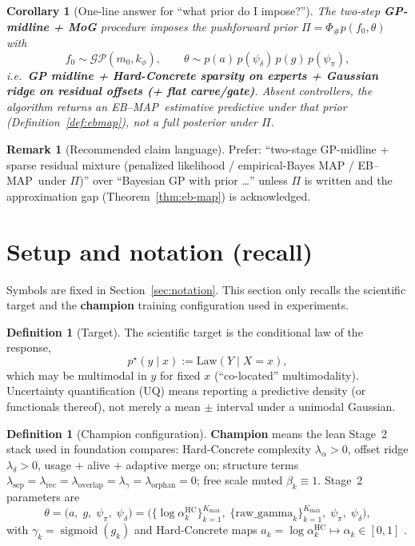 \documentclass[11pt,a4paper]{article}
\theoremstyle{plain}
\newtheorem{corollary}[theorem]{Corollary}
\theoremstyle{definition}
\newtheorem{definition}[theorem]{Definition}
\newtheorem{remark}[theorem]{Remark}
\theoremstyle{remark}
\newcommand{\GP}{\mathcal{GP}}
\newcommand{\tht}{\theta}
\newcommand{\sigmoid}{\operatorname{sigmoid}}
\newcommand{\Kmax}{K_{\max}}
\newcommand{\law}{\mathrm{Law}}
\newcommand{\EBMAP}{EB--MAP}
\begin{document}
\begin{corollary}[One-line answer for ``what prior do I impose?'']
The two-step \textbf{GP-midline + MoG} procedure imposes the pushforward prior
\(\Pi=\Phi_\# p(f_0,\tht)\) with
\begin{equation}
  f_0\sim\GP(m_0,k_\phi),
  \qquad
  \tht\sim p(a)\,p(\psi_\delta)\,p(g)\,p(\psi_\pi),
\end{equation}
i.e.\ \textbf{GP midline + Hard-Concrete sparsity on experts + Gaussian ridge on residual
offsets (+ flat carve/gate)}.
Absent controllers, the algorithm returns an \EBMAP\ estimative predictive under that
prior (Definition~\ref{def:ebmap}), not a full posterior under \(\Pi\).
\end{corollary}

\begin{remark}[Recommended claim language]
Prefer: ``two-stage GP-midline + sparse residual mixture (penalized likelihood /
empirical-Bayes MAP / \EBMAP\ under \(\Pi\))''
over ``Bayesian GP with prior \ldots'' unless \(\Pi\) is written and the approximation
gap (Theorem~\ref{thm:eb-map}) is acknowledged.
\end{remark}

\section{Setup and notation (recall)}
\label{sec:setup}

Symbols are fixed in Section~\ref{sec:notation}. This section only recalls the
scientific target and the \textbf{champion} training configuration used in experiments.

\begin{definition}[Target]
The scientific target is the conditional law of the response,
\[
  p^\star(y\mid x)
  :=
  \law(Y\mid X=x),
\]
which may be multimodal in \(y\) for fixed \(x\) (``co-located'' multimodality).
Uncertainty quantification (UQ) means reporting a predictive density (or functionals
thereof), not merely a mean \(\pm\) interval under a unimodal Gaussian.
\end{definition}

\begin{definition}[Champion configuration]
\label{def:champion}
\textbf{Champion} means the lean Stage~2 stack used in foundation compares:
Hard-Concrete complexity \(\lambda_\alpha>0\), offset ridge \(\lambda_\delta>0\),
usage + alive + adaptive merge on; structure terms
\(\lambda_{\mathrm{sep}}=\lambda_{\mathrm{rec}}=\lambda_{\mathrm{overlap}}=\lambda_\gamma=\lambda_{\mathrm{orphan}}=0\);
free scale muted \(\beta_k\equiv 1\).
Stage~2 parameters are
\[
  \tht
  =
  \bigl(
    a,\;
    g,\;
    \psi_{\pi},\;
    \psi_{\delta}
  \bigr)
  =
  \bigl(
    \{\log\alpha_k^{\mathrm{HC}}\}_{k=1}^{\Kmax},\;
    \{\mathrm{raw\_gamma}_k\}_{k=1}^{\Kmax},\;
    \psi_{\pi},\;
    \psi_{\delta}
  \bigr),
\]
with \(\gamma_k=\sigmoid(g_k)\) and Hard-Concrete maps
\(a_k=\log\alpha_k^{\mathrm{HC}}\mapsto\alpha_k\in[0,1]\)
\citep{Louizos2018}.
\end{definition}
\end{document}
